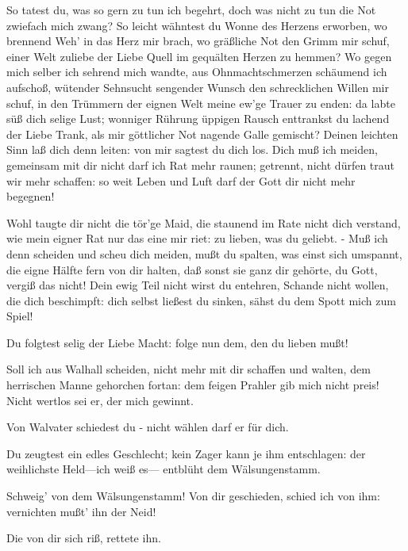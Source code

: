 \begin{drama}
\Wotanspeaks
So tatest du, was so gern zu tun ich begehrt,
doch was nicht zu tun die Not zwiefach mich zwang?
So leicht wähntest du Wonne des Herzens erworben,
wo brennend Weh' in das Herz mir brach,
wo gräßliche Not
den Grimm mir schuf,
einer Welt zuliebe der Liebe Quell
im gequälten Herzen zu hemmen?
Wo gegen mich selber
ich sehrend mich wandte,
aus Ohnmachtschmerzen
schäumend ich aufschoß,
wütender Sehnsucht sengender Wunsch
den schrecklichen Willen mir schuf,
in den Trümmern der eignen Welt
meine ew'ge Trauer zu enden:
da labte süß dich selige Lust;
wonniger Rührung üppigen Rausch
enttrankst du lachend der Liebe Trank,
als mir göttlicher Not nagende Galle gemischt?
Deinen leichten Sinn laß dich denn leiten:
von mir sagtest du dich los.
Dich muß ich meiden,
gemeinsam mit dir
nicht darf ich Rat mehr raunen;
getrennt, nicht dürfen
traut wir mehr schaffen:
so weit Leben und Luft
darf der Gott dir nicht mehr begegnen!
 

\Brunnhildespeaks
Wohl taugte dir nicht die tör'ge Maid,
die staunend im Rate
nicht dich verstand,
wie mein eigner Rat
nur das eine mir riet:
zu lieben, was du geliebt. -
Muß ich denn scheiden und scheu dich meiden,
mußt du spalten, was einst sich umspannt,
die eigne Hälfte fern von dir halten,
daß sonst sie ganz dir gehörte,
du Gott, vergiß das nicht!
Dein ewig Teil nicht wirst du entehren,
Schande nicht wollen, die dich beschimpft:
dich selbst ließest du sinken,
sähst du dem Spott mich zum Spiel!
 

\Wotanspeaks
Du folgtest selig der Liebe Macht:
folge nun dem, den du lieben mußt!
 

\Brunnhildespeaks
Soll ich aus Walhall scheiden,
nicht mehr mit dir schaffen und walten,
dem herrischen Manne gehorchen fortan:
dem feigen Prahler gib mich nicht preis!
Nicht wertlos sei er, der mich gewinnt.
 

\Wotanspeaks
Von Walvater schiedest du -
nicht wählen darf er für dich.
 

\Brunnhildespeaks


Du zeugtest ein edles Geschlecht;
kein Zager kann je ihm entschlagen:
der weihlichste Held---ich weiß es---
entblüht dem Wälsungenstamm.
 

\Wotanspeaks
Schweig' von dem Wälsungenstamm!
Von dir geschieden, schied ich von ihm:
vernichten mußt' ihn der Neid!
 

\Brunnhildespeaks
Die von dir sich riß, rettete ihn.
 



\end{drama}
